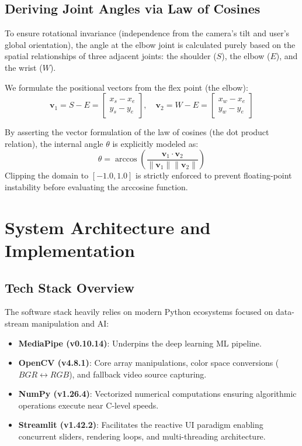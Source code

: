 \documentclass[12pt, a4paper]{article}
\begin{document}
\subsection{Deriving Joint Angles via Law of Cosines}
To ensure rotational invariance (independence from the camera's tilt and user's global orientation), the angle at the elbow joint is calculated purely based on the spatial relationships of three adjacent joints: the shoulder ($S$), the elbow ($E$), and the wrist ($W$). 

We formulate the positional vectors from the flex point (the elbow):
\begin{equation}
\mathbf{v}_1 = S - E = \begin{bmatrix} x_s - x_e \\ y_s - y_e \end{bmatrix}, \quad
\mathbf{v}_2 = W - E = \begin{bmatrix} x_w - x_e \\ y_w - y_e \end{bmatrix}
\end{equation}

By asserting the vector formulation of the law of cosines (the dot product relation), the internal angle $\theta$ is explicitly modeled as:
\begin{equation}
\theta = \arccos\left( \frac{\mathbf{v}_1 \cdot \mathbf{v}_2}{\|\mathbf{v}_1\| \|\mathbf{v}_2\|} \right)
\end{equation}
Clipping the domain to $[-1.0, 1.0]$ is strictly enforced to prevent floating-point instability before evaluating the arccosine function.


\section{System Architecture and Implementation}

\subsection{Tech Stack Overview}
The software stack heavily relies on modern Python ecosystems focused on data-stream manipulation and AI:
\begin{itemize}
    \item \textbf{MediaPipe (v0.10.14)}: Underpins the deep learning ML pipeline.
    \item \textbf{OpenCV (v4.8.1)}: Core array manipulations, color space conversions ($BGR \leftrightarrow RGB$), and fallback video source capturing.
    \item \textbf{NumPy (v1.26.4)}: Vectorized numerical computations ensuring algorithmic operations execute near C-level speeds.
    \item \textbf{Streamlit (v1.42.2)}: Facilitates the reactive UI paradigm enabling concurrent sliders, rendering loops, and multi-threading architecture.
\end{itemize}
\end{document}
